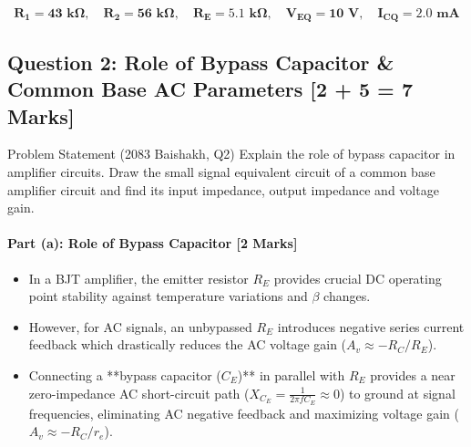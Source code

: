 \documentclass[11pt,a4paper,oneside]{book}
\begin{document}
\begin{answerbox}
$$\mathbf{R_1 = 43\text{ k}\Omega, \quad R_2 = 56\text{ k}\Omega, \quad R_E = 5.1\text{ k}\Omega, \quad V_{EQ} = 10\text{ V}, \quad I_{CQ} = 2.0\text{ mA}}$$
\end{answerbox}

\vspace{0.6cm}

\subsection{Question 2: Role of Bypass Capacitor \& Common Base AC Parameters [2 + 5 = 7 Marks]}
\begin{questionbox}{Problem Statement (2083 Baishakh, Q2)}
Explain the role of bypass capacitor in amplifier circuits. Draw the small signal equivalent circuit of a common base amplifier circuit and find its input impedance, output impedance and voltage gain.
\end{questionbox}

\paragraph{Part (a): Role of Bypass Capacitor [2 Marks]}
\begin{itemize}[leftmargin=1.5em]
  \item In a BJT amplifier, the emitter resistor $R_E$ provides crucial DC operating point stability against temperature variations and $\beta$ changes.
  \item However, for AC signals, an unbypassed $R_E$ introduces negative series current feedback which drastically reduces the AC voltage gain ($A_v \approx -R_C/R_E$).
  \item Connecting a **bypass capacitor ($C_E$)** in parallel with $R_E$ provides a near zero-impedance AC short-circuit path ($X_{C_E} = \frac{1}{2\pi f C_E} \approx 0$) to ground at signal frequencies, eliminating AC negative feedback and maximizing voltage gain ($A_v \approx -R_C/r_e$).
\end{itemize}
\end{document}
